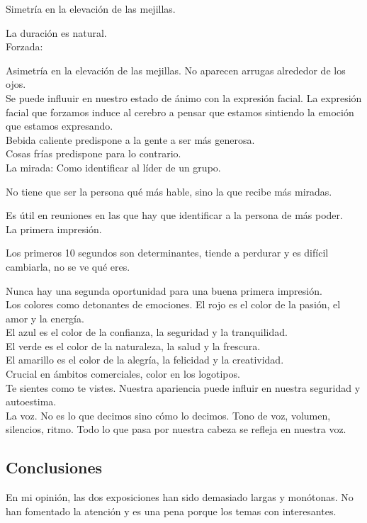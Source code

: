 \documentclass[12pt, a4paper, twoside]{article}
\begin{document}
Simetría en la elevación de las mejillas.

La duración es natural.\\
Forzada:

Asimetría en la elevación de las mejillas.
No aparecen arrugas alrededor de los ojos.\\


Se puede influuir en nuestro estado de ánimo con la expresión facial.
La expresión facial que forzamos induce al cerebro a pensar que estamos 
sintiendo la emoción que estamos expresando.\\

Bebida caliente predispone a la gente a ser más generosa.\\
Cosas frías predispone para lo contrario.\\

La mirada:
Como identificar al líder de un grupo.

No tiene que ser la persona qué más hable, sino la que recibe más miradas.

Es útil en reuniones en las que hay que identificar a la persona de más poder.\\

La primera impresión.

Los primeros 10 segundos son determinantes, tiende a perdurar y es difícil cambiarla, 
no se ve qué eres.

Nunca hay una segunda oportunidad para una buena primera impresión.\\

Los colores como detonantes de emociones.
El rojo es el color de la pasión, el amor y la energía.\\
El azul es el color de la confianza, la seguridad y la tranquilidad.\\
El verde es el color de la naturaleza, la salud y la frescura.\\
El amarillo es el color de la alegría, la felicidad y la creatividad.\\
Crucial en ámbitos comerciales, color en los logotipos.\\

Te sientes como te vistes.
Nuestra apariencia puede influir en nuestra seguridad y autoestima.\\

La voz. No es lo que decimos sino cómo lo decimos. Tono de voz, volumen, 
silencios, ritmo. Todo lo que pasa por nuestra cabeza se refleja
en nuestra voz.\\

\subsection{Conclusiones}

En mi opinión, las dos exposiciones han sido demasiado largas y monótonas.
No han fomentado la atención y es una pena porque los temas con interesantes.
\end{document}
